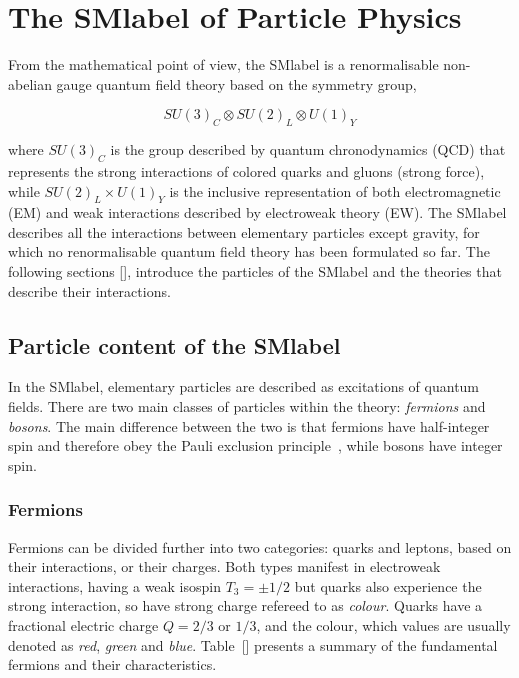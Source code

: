 \section{The \acrlong{SMlabel} of Particle Physics}

From the mathematical point of view, the \acrshort{SMlabel} is a renormalisable non-abelian gauge quantum field theory based on the symmetry group, 

\begin{equation}
    \label{Theory_eq:SMgroup}
    SU(3)_C\otimes SU(2)_L\otimes U(1)_Y
\end{equation}

where $SU(3)_C$ is the group described by quantum chronodynamics (QCD) that represents the strong interactions of colored quarks and gluons (strong force), while $SU(2)_L\times U(1)_Y$ is the inclusive representation of both electromagnetic (EM) and weak interactions described by electroweak theory (EW). The \acrshort{SMlabel} describes all the interactions between elementary particles except gravity, for which no renormalisable quantum field theory has been formulated so far. The following sections [], introduce the particles of the \acrshort{SMlabel} and the theories that describe their interactions.  

\subsection{Particle content of the \acrlong{SMlabel}}

In the \acrshort{SMlabel}, elementary particles are described as excitations of quantum fields. There are two main classes of particles within the theory: \textit{fermions} and \textit{bosons}. The main difference between the two is that fermions have half-integer spin and therefore obey the Pauli exclusion principle~\cite{Pauli1925}, while bosons have integer spin.

\subsubsection{Fermions}

Fermions can be divided further into two categories: quarks and leptons, based on their interactions, or their charges. Both types manifest in electroweak interactions, having a weak isospin $T_3=\pm1/2$ but quarks also experience the strong interaction, so have strong charge refereed to as \textit{colour}. Quarks have a fractional electric charge $Q=2/3$ or $1/3$, and the colour, which values are usually denoted as \textit{red}, \textit{green} and \textit{blue}. Table~[] presents a summary of the fundamental fermions and their characteristics.\\

